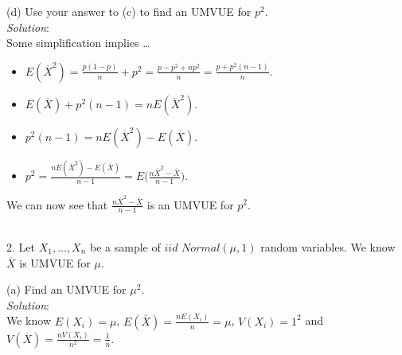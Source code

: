 \documentclass[12pt]{article}
\newcommand{\XB}{\color{black}}
\newcommand{\XBB}{\color{blue}}
\newcommand{\ds}{\displaystyle}
\begin{document}
(d) Use your answer to (c) to find an UMVUE for $ p^{2} $.
\vspace{2.5mm} \\
\textit{Solution}:
\vspace{2.5mm} \\

\noindent
Some simplification implies \dots

\begin{itemize}
    \item $ \ds E(\overline{X}^{2}) = \frac{p(1-p)}{n} + p^{2} = \frac{p - p^{2} + np^{2}}{n} = \frac{p + p^{2}(n - 1)}{n} $.
    \item $ \ds E(\overline{X}) + p^{2}(n - 1) = nE(\overline{X}^{2}) $.
    \item $ \ds p^{2}(n-1) = nE(\overline{X}^{2}) - E(\overline{X}) $.
    \item $ \ds p^{2} = \frac{nE(\overline{X}^{2}) - E(\overline{X})}{n - 1} = E \Biggl( \frac{n\overline{X}^{2} - \overline{X}}{n - 1} \Biggr) $.
\end{itemize}

\noindent
We can now see that $ \ds \frac{n\overline{X}^{2} - \overline{X}}{n - 1} $ is an UMVUE for $ p^{2} $. \\

\vspace{2.5mm}

\newpage
\XBB\hrulefill\XB \\

2. Let $ X_{1},\dots,X_{n} $ be a sample of $ iid $ $ Normal(\mu, 1) $ random variables. We know $ \overline{X} $ is UMVUE for $ \mu $.

\XBB\hrulefill\XB 
\vspace{5mm} 

(a) Find an UMVUE for $\mu^{2} $.
\vspace{2.5mm} \\
\textit{Solution}:
\vspace{2.5mm} \\

\noindent
We know $ \ds E(X_{i}) = \mu $, $ \ds E(\overline{X}) = \frac{nE(X_{i})}{n} = \mu $, $ \ds V(X_{i}) = 1^{2} $ and $ \ds V(\overline{X}) = \frac{nV(X_{i})}{n^{2}} = \frac{1}{n} $. \\
\end{document}
